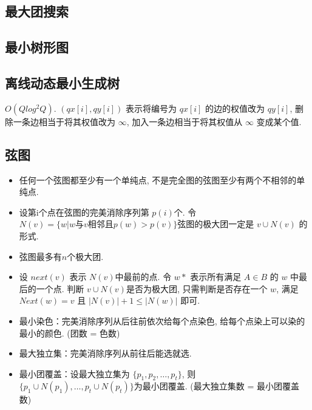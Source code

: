 \documentclass[landscape, twocolumn, 8pt, a4paper, twoside]{extarticle}
\begin{document}
  \subsection{最大团搜索}
    
  
%    

  \subsection{最小树形图}
    

  \subsection{离线动态最小生成树}
    $O (Q log^2 Q) $.
    $(qx[i], qy[i])$ 表示将编号为 $qx[i]$ 的边的权值改为 $qy[i]$,
    删除一条边相当于将其权值改为 $\infty$,
    加入一条边相当于将其权值从 $\infty$ 变成某个值.
    

  \subsection{弦图}
    \begin{itemize}
    \item 任何一个弦图都至少有一个单纯点, 不是完全图的弦图至少有两个不相邻的单纯点. 
    \item 设第i个点在弦图的完美消除序列第 $p(i)$个. 令 $N(v) = \{w | w \text{与} v \text{相邻且} p(w) > p(v) \}$弦图的极大团一定是 $v \cup N(v)$ 的形式. 
    \item 弦图最多有$n$个极大团. 
    \item 设 $next(v)$ 表示 $N(v)$中最前的点. 令 $w*$ 表示所有满足 $A\in B$ 的 $w$ 中最后的一个点. 
          判断 $v \cup N(v)$是否为极大团,
          只需判断是否存在一个 $w$, 
          满足 $Next(w) = v$ 且 $|N(v)| + 1 \le |N(w)|$ 即可. 
    \item 最小染色：完美消除序列从后往前依次给每个点染色, 给每个点染上可以染的最小的颜色. (团数 = 色数)
    \item 最大独立集：完美消除序列从前往后能选就选. 
    \item 最小团覆盖：设最大独立集为 $\{p_1, p_2, \ldots, p_t\}$, 则 $\{p_1 \cup N(p_1), \ldots, p_t \cup N(p_t) \}$为最小团覆盖.  (最大独立集数 = 最小团覆盖数)
    \end{itemize}
\end{document}
